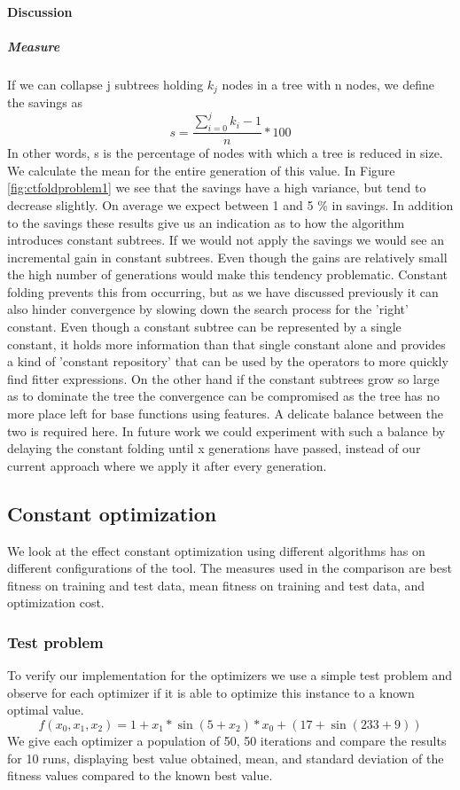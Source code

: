\paragraph{Discussion}
\subparagraph{Measure}
If we can collapse j subtrees holding $k_j$ nodes in a tree with n nodes, we define the savings as 
\[
s = \frac{\sum_{i=0}^{j} k_i - 1}{n} * 100
\]
In other words, s is the percentage of nodes with which a tree is reduced in size.
We calculate the mean for the entire generation of this value.
In Figure \ref{fig:ctfoldproblem1} we see that the savings have a high variance, but tend to decrease slightly. On average we expect between 1 and 5 \% in savings. In addition to the savings these results give us an indication as to how the algorithm introduces constant subtrees. If we would not apply the savings we would see an incremental gain in constant subtrees. Even though the gains are relatively small the high number of generations would make this tendency problematic. 
Constant folding prevents this from occurring, but as we have discussed previously it can also hinder convergence by slowing down the search process for the 'right' constant. Even though a constant subtree can be represented by a single constant, it holds more information than that single constant alone and provides a kind of 'constant repository' that can be used by the operators to more quickly find fitter expressions. On the other hand if the constant subtrees grow so large as to dominate the tree the convergence can be compromised as the tree has no more place left for base functions using features. A delicate balance between the two is required here. In future work we could experiment with such a balance by delaying the constant folding until x generations have passed, instead of our current approach where we apply it after every generation. 

\subsection{Constant optimization}
We look at the effect constant optimization using different algorithms has on different configurations of the tool. The measures used in the comparison are best fitness on training and test data, mean fitness on training and test data, and optimization cost.

\subsubsection{Test problem}
To verify our implementation for the optimizers we use a simple test problem and observe for each optimizer if it is able to optimize this instance to a known optimal value.
\[
f(x_0, x_1, x_2) = 1 + x_1 * \sin (5+x_2) * x_0 + (17 + \sin (233+9))
\]
We give each optimizer a population of 50, 50 iterations and compare the results for 10 runs, displaying best value obtained, mean, and standard deviation of the fitness values compared to the known best value.
